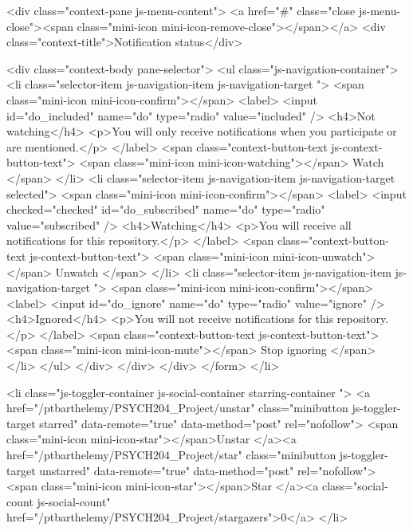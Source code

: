     <div class="context-pane js-menu-content">
      <a href="#" class="close js-menu-close"><span class="mini-icon mini-icon-remove-close"></span></a>
      <div class="context-title">Notification status</div>

      <div class="context-body pane-selector">
        <ul class="js-navigation-container">
          <li class="selector-item js-navigation-item js-navigation-target ">
            <span class="mini-icon mini-icon-confirm"></span>
            <label>
              <input id="do_included" name="do" type="radio" value="included" />
              <h4>Not watching</h4>
              <p>You will only receive notifications when you participate or are mentioned.</p>
            </label>
            <span class="context-button-text js-context-button-text">
              <span class="mini-icon mini-icon-watching"></span>
              Watch
            </span>
          </li>
          <li class="selector-item js-navigation-item js-navigation-target selected">
            <span class="mini-icon mini-icon-confirm"></span>
            <label>
              <input checked="checked" id="do_subscribed" name="do" type="radio" value="subscribed" />
              <h4>Watching</h4>
              <p>You will receive all notifications for this repository.</p>
            </label>
            <span class="context-button-text js-context-button-text">
              <span class="mini-icon mini-icon-unwatch"></span>
              Unwatch
            </span>
          </li>
          <li class="selector-item js-navigation-item js-navigation-target ">
            <span class="mini-icon mini-icon-confirm"></span>
            <label>
              <input id="do_ignore" name="do" type="radio" value="ignore" />
              <h4>Ignored</h4>
              <p>You will not receive notifications for this repository.</p>
            </label>
            <span class="context-button-text js-context-button-text">
              <span class="mini-icon mini-icon-mute"></span>
              Stop ignoring
            </span>
          </li>
        </ul>
      </div>
    </div>
  </div>
</form>
          </li>

          <li class="js-toggler-container js-social-container starring-container ">
            <a href="/ptbarthelemy/PSYCH204_Project/unstar" class="minibutton js-toggler-target starred" data-remote="true" data-method="post" rel="nofollow">
              <span class="mini-icon mini-icon-star"></span>Unstar
            </a><a href="/ptbarthelemy/PSYCH204_Project/star" class="minibutton js-toggler-target unstarred" data-remote="true" data-method="post" rel="nofollow">
              <span class="mini-icon mini-icon-star"></span>Star
            </a><a class="social-count js-social-count" href="/ptbarthelemy/PSYCH204_Project/stargazers">0</a>
          </li>

